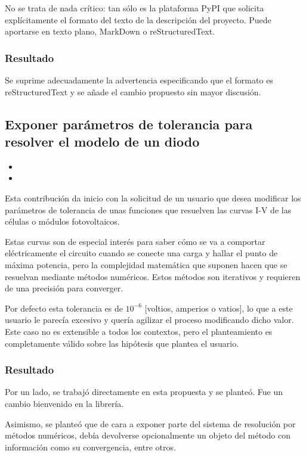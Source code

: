No se trata de nada crítico: tan sólo es la plataforma PyPI que solicita explícitamente el formato del texto de la descripción del proyecto. Puede aportarse en texto plano, MarkDown o reStructuredText.

\subsubsection{Resultado}

Se suprime adecuadamente la advertencia especificando que el formato es reStructuredText y se añade el cambio propuesto sin mayor discusión.

\subsection{Exponer parámetros de tolerancia para resolver el modelo de un diodo}

\begin{itemize}
    \item {}
    \item {}
\end{itemize}

Esta contribución da inicio con la solicitud de un usuario que desea modificar los parámetros de tolerancia de unas funciones que resuelven las curvas I-V de las células o módulos fotovoltaicos.

Estas curvas son de especial interés para saber cómo se va a comportar eléctricamente el circuito cuando se conecte una carga y hallar el punto de máxima potencia, pero la complejidad matemática que suponen hacen que se resuelvan mediante métodos numéricos. Estos métodos son iterativos y requieren de una precisión para converger.

Por defecto esta tolerancia es de $10^{-6}$ [voltios, amperios o vatios], lo que a este usuario le parecía excesivo y quería agilizar el proceso modificando dicho valor. Este caso no es extensible a todos los contextos, pero el planteamiento es completamente válido sobre las hipótesis que plantea el usuario.

\subsubsection{Resultado}

Por un lado, se trabajó directamente en esta propuesta y se planteó. Fue un cambio bienvenido en la librería.

Asimismo, se planteó que de cara a exponer parte del sistema de resolución por métodos numéricos, debía devolverse opcionalmente un objeto del método con información como su convergencia, entre otros.

